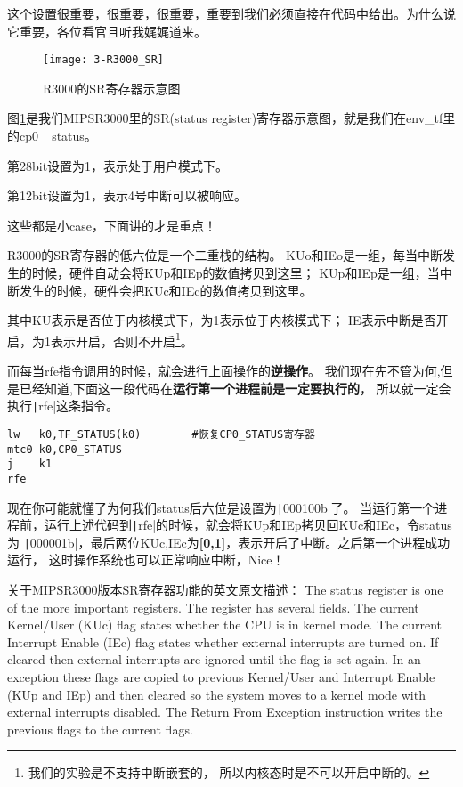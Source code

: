 这个设置很重要，很重要，很重要，重要到我们必须直接在代码中给出。为什么说它重要，各位看官且听我娓娓道来。

\begin{figure}[htbp]
  \centering
  \texttt{[image: 3-R3000\_SR]}
  \caption{R3000的SR寄存器示意图}\label{fig:3-R3000_SR} 
\end{figure}

图\ref{fig:3-R3000_SR}是我们MIPSR3000里的SR(status register)寄存器示意图，就是我们在env\_tf里的cp0\_ status。

第28bit设置为1，表示处于用户模式下。

第12bit设置为1，表示4号中断可以被响应。

这些都是小case，下面讲的才是重点！

R3000的SR寄存器的低六位是一个二重栈的结构。
KUo和IEo是一组，每当中断发生的时候，硬件自动会将KUp和IEp的数值拷贝到这里；
KUp和IEp是一组，当中断发生的时候，硬件会把KUc和IEc的数值拷贝到这里。

其中KU表示是否位于内核模式下，为1表示位于内核模式下；
IE表示中断是否开启，为1表示开启，否则不开启\footnote{我们的实验是不支持中断嵌套的，
所以内核态时是不可以开启中断的。}。

而每当rfe指令调用的时候，就会进行上面操作的\textbf{逆操作}。
我们现在先不管为何,但是已经知道,下面这一段代码在\textbf{运行第一个进程前是一定要执行的}，
\label{env_pop_tf}所以就一定会执行\texttt|rfe|这条指令。

\begin{verbatim}
lw   k0,TF_STATUS(k0)        #恢复CP0_STATUS寄存器    
mtc0 k0,CP0_STATUS
j    k1
rfe
\end{verbatim}

现在你可能就懂了为何我们status后六位是设置为\texttt|000100b|了。
当运行第一个进程前，运行上述代码到\texttt|rfe|的时候，就会将KUp和IEp拷贝回KUc和IEc，令status为 
\texttt|000001b|，最后两位KUc,IEc为\textbf{[0,1]}，表示开启了中断。之后第一个进程成功运行，
这时操作系统也可以正常响应中断，Nice！

\begin{note}
{\small 关于MIPSR3000版本SR寄存器功能的英文原文描述：
The status register is one of the more important registers. The register has several
fields. The current Kernel/User (KUc) flag states whether the CPU is in kernel mode.
The current Interrupt Enable (IEc) flag states whether external interrupts are turned on.
If cleared then external interrupts are ignored until the flag is set again. In an exception
these flags are copied to previous Kernel/User and Interrupt Enable (KUp and IEp) and
then cleared so the system moves to a kernel mode with external interrupts disabled.
The Return From Exception instruction writes the previous flags to the current flags.}
\end{note}

